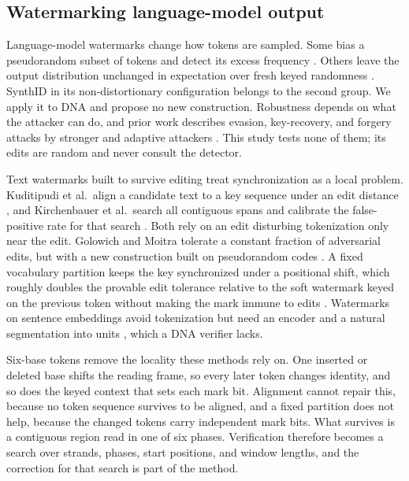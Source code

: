 \documentclass[10pt,twocolumn]{article}
\begin{document}
\subsection{Watermarking language-model output}

Language-model watermarks change how tokens are sampled. Some bias a pseudorandom subset of tokens
and detect its excess frequency \cite{kirchenbauer2023watermark}. Others leave the output
distribution unchanged in expectation over fresh keyed randomness
\cite{christ2024undetectable,kuditipudi2024robust,aaronson2022watermark,hu2024unbiased,wu2024dipmark}.
SynthID in its non-distortionary configuration belongs to the second group. We apply it to DNA and
propose no new construction. Robustness depends on what the attacker can do, and prior work
describes evasion, key-recovery, and forgery attacks by stronger and adaptive attackers
\cite{zhang2024sand,diaa2025adaptive,sadasivan2025reliably,jovanovic2024stealing,reynolds2025breaking}.
This study tests none of them; its edits are random and never consult the detector.

Text watermarks built to survive editing treat synchronization as a local problem. Kuditipudi
et al.\ align a candidate text to a key sequence under an edit distance
\cite{kuditipudi2024robust}, and Kirchenbauer et al.\ search all contiguous spans and calibrate the
false-positive rate for that search \cite{kirchenbauer2024reliability}. Both rely on an edit
disturbing tokenization only near the edit. Golowich and Moitra tolerate a constant fraction of
adversarial edits, but with a new construction built on pseudorandom codes
\cite{golowich2024edit}. A fixed vocabulary partition keeps the key synchronized under a positional
shift, which roughly doubles the provable edit tolerance relative to the soft watermark keyed on
the previous token without making the mark immune to edits \cite{zhao2024provable}. Watermarks on
sentence embeddings avoid tokenization but need an encoder and a natural segmentation into units
\cite{hou2024semstamp}, which a DNA verifier lacks.

Six-base tokens remove the locality these methods rely on. One inserted or deleted base shifts the
reading frame, so every later token changes identity, and so does the keyed context that sets each
mark bit. Alignment cannot repair this, because no token sequence survives to be aligned, and a
fixed partition does not help, because the changed tokens carry independent mark bits. What
survives is a contiguous region read in one of six phases. Verification therefore becomes a search
over strands, phases, start positions, and window lengths, and the correction for that search is
part of the method.
\end{document}

